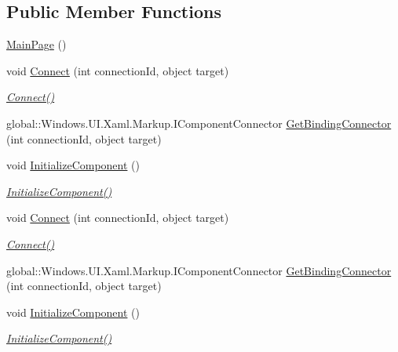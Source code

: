 \subsection*{Public Member Functions}
\begin{DoxyCompactItemize}
\item 
\hyperlink{class_eli_log_in_app_1_1_main_page_a808b295c704ccd3b5172171b32780f4f}{Main\+Page} ()
\item 
void \hyperlink{class_eli_log_in_app_1_1_main_page_a91b51a574c226bfbec61f7deaba558e9}{Connect} (int connection\+Id, object target)
\begin{DoxyCompactList}\small\item\em \hyperlink{class_eli_log_in_app_1_1_main_page_a91b51a574c226bfbec61f7deaba558e9}{Connect()} \end{DoxyCompactList}\item 
global\+::\+Windows.\+U\+I.\+Xaml.\+Markup.\+I\+Component\+Connector \hyperlink{class_eli_log_in_app_1_1_main_page_a9737f0f488d2941971b9f597fcacef77}{Get\+Binding\+Connector} (int connection\+Id, object target)
\item 
void \hyperlink{class_eli_log_in_app_1_1_main_page_a7f0e43eb30fdabe71d3e986d17322783}{Initialize\+Component} ()
\begin{DoxyCompactList}\small\item\em \hyperlink{class_eli_log_in_app_1_1_main_page_a7f0e43eb30fdabe71d3e986d17322783}{Initialize\+Component()} \end{DoxyCompactList}\item 
void \hyperlink{class_eli_log_in_app_1_1_main_page_a91b51a574c226bfbec61f7deaba558e9}{Connect} (int connection\+Id, object target)
\begin{DoxyCompactList}\small\item\em \hyperlink{class_eli_log_in_app_1_1_main_page_a91b51a574c226bfbec61f7deaba558e9}{Connect()} \end{DoxyCompactList}\item 
global\+::\+Windows.\+U\+I.\+Xaml.\+Markup.\+I\+Component\+Connector \hyperlink{class_eli_log_in_app_1_1_main_page_a9737f0f488d2941971b9f597fcacef77}{Get\+Binding\+Connector} (int connection\+Id, object target)
\item 
void \hyperlink{class_eli_log_in_app_1_1_main_page_a7f0e43eb30fdabe71d3e986d17322783}{Initialize\+Component} ()
\begin{DoxyCompactList}\small\item\em \hyperlink{class_eli_log_in_app_1_1_main_page_a7f0e43eb30fdabe71d3e986d17322783}{Initialize\+Component()} \end{DoxyCompactList}\item 

\end{DoxyCompactItemize}
